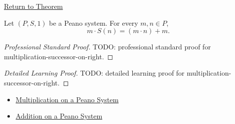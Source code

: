 \newpage
{}
\label{prf:multiplication-successor-on-right}

\begin{remark*}[Return]
\hyperref[thm:multiplication-successor-on-right]{Return to Theorem}
\end{remark*}

\begin{theorem*}
Let $(P,S,1)$ be a Peano system. For every $m,n \in P$,
\[
m \cdot S(n) = (m \cdot n) + m.
\]
\end{theorem*}

\begin{proof}[Professional Standard Proof]
\LRAProofBodyStart
TODO: professional standard proof for multiplication-successor-on-right.
\end{proof}

\begin{proof}[Detailed Learning Proof]
\LRAProofBodyStart
TODO: detailed learning proof for multiplication-successor-on-right.
\end{proof}

\begin{remark*}
\end{remark*}

\begin{dependencies}
\begin{itemize}
  \item \hyperref[def:multiplication-on-peano-system]{Multiplication on a Peano System}
  \item \hyperref[def:addition-on-peano-system]{Addition on a Peano System}
\end{itemize}
\end{dependencies}

\clearpage
